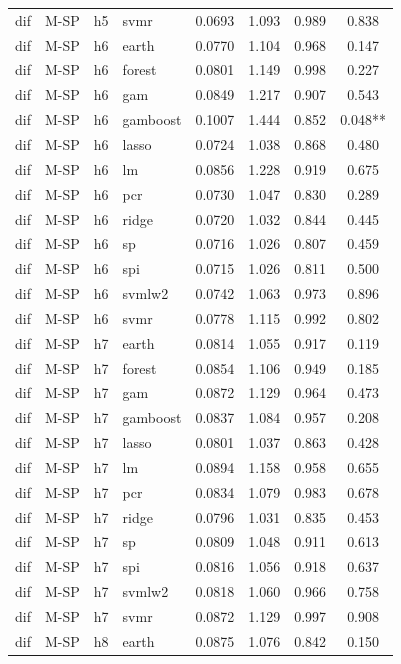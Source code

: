 \begin{ThreePartTable}
\begin{longtable}[t]{llclcccc}
dif & M-SP & h5 & svmr & 0.0693 & 1.093 & 0.989 & 0.838\\
\addlinespace
dif & M-SP & h6 & earth & 0.0770 & 1.104 & 0.968 & 0.147\\
dif & M-SP & h6 & forest & 0.0801 & 1.149 & 0.998 & 0.227\\
dif & M-SP & h6 & gam & 0.0849 & 1.217 & 0.907 & 0.543\\
dif & M-SP & h6 & gamboost & 0.1007 & 1.444 & 0.852 & 0.048**\\
dif & M-SP & h6 & lasso & 0.0724 & 1.038 & 0.868 & 0.480\\
dif & M-SP & h6 & lm & 0.0856 & 1.228 & 0.919 & 0.675\\
dif & M-SP & h6 & pcr & 0.0730 & 1.047 & 0.830 & 0.289\\
dif & M-SP & h6 & ridge & 0.0720 & 1.032 & 0.844 & 0.445\\
dif & M-SP & h6 & sp & 0.0716 & 1.026 & 0.807 & 0.459\\
dif & M-SP & h6 & spi & 0.0715 & 1.026 & 0.811 & 0.500\\
dif & M-SP & h6 & svmlw2 & 0.0742 & 1.063 & 0.973 & 0.896\\
dif & M-SP & h6 & svmr & 0.0778 & 1.115 & 0.992 & 0.802\\
\addlinespace
dif & M-SP & h7 & earth & 0.0814 & 1.055 & 0.917 & 0.119\\
dif & M-SP & h7 & forest & 0.0854 & 1.106 & 0.949 & 0.185\\
dif & M-SP & h7 & gam & 0.0872 & 1.129 & 0.964 & 0.473\\
dif & M-SP & h7 & gamboost & 0.0837 & 1.084 & 0.957 & 0.208\\
dif & M-SP & h7 & lasso & 0.0801 & 1.037 & 0.863 & 0.428\\
dif & M-SP & h7 & lm & 0.0894 & 1.158 & 0.958 & 0.655\\
dif & M-SP & h7 & pcr & 0.0834 & 1.079 & 0.983 & 0.678\\
dif & M-SP & h7 & ridge & 0.0796 & 1.031 & 0.835 & 0.453\\
dif & M-SP & h7 & sp & 0.0809 & 1.048 & 0.911 & 0.613\\
dif & M-SP & h7 & spi & 0.0816 & 1.056 & 0.918 & 0.637\\
dif & M-SP & h7 & svmlw2 & 0.0818 & 1.060 & 0.966 & 0.758\\
dif & M-SP & h7 & svmr & 0.0872 & 1.129 & 0.997 & 0.908\\
\addlinespace
dif & M-SP & h8 & earth & 0.0875 & 1.076 & 0.842 & 0.150\\

\end{longtable}
\end{ThreePartTable}

